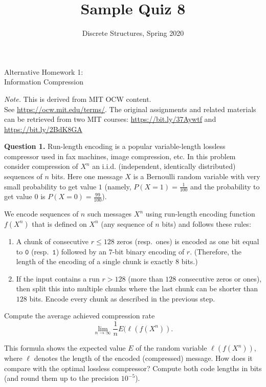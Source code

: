 \documentclass[jou]{apa6}
\title{Sample Quiz 8}
\author{Discrete Structures, Spring 2020}
\affiliation{RBS}
\begin{document}
\twocolumn
\thispagestyle{empty}

\begin{center}
{\Large Alternative Homework 1:}\\
{\Large Information Compression}
\end{center}


\begin{changemargin}{10pt}{10pt}
{\footnotesize
{\em Note.} This is derived from MIT OCW content.\\
See \url{https://ocw.mit.edu/terms/}. 
The original assignments and related materials can be retrieved from two MIT courses:
\url{https://bit.ly/37Aywtf} and \url{https://bit.ly/2BdK8GA}\\
}
\end{changemargin}


{\bf Question 1.} 
Run-length encoding is a popular variable-length lossless compressor used in fax machines, image
compression, etc. 
In this problem consider compression of $X^n$ \textendash{} an i.i.d. (independent, identically distributed) sequences 
of $n$ bits. 
Here one message $X$ is a Bernoulli random variable with very small probability to get value $1$ 
(namely, $P(X=1) = \frac{1}{100}$ and the probability to get value $0$ is $P(X=0) = \frac{99}{100}$). 


We encode sequences of $n$ such messages $X^n$ using run-length encoding function $f(X^n)$ that is defined on $X^n$ 
(any sequence of $n$ bits) and follows these rules:
\begin{enumerate}
\item A chunk of consecutive $r \leq 128$ zeros (resp.\ ones) 
is encoded as one bit equal to $\mathtt{0}$ (resp.\ $\mathtt{1}$) followed by an $7$-bit binary encoding of $r$. 
(Therefore, the length of the encoding of a single chunk is exactly $8$ bits.)
\item If the input contains 
a run $r>128$ (more than $128$ consecutive zeros or ones), then split this into multiple chunks where the last chunk 
can be shorter than $128$ bits. Encode every chunk as described in the previous step.
\end{enumerate}
Compute the average achieved compression rate
$$\lim_{n \rightarrow \infty} \frac{1}{n} E(\ell(f(X^n)).$$

This formula shows the expected value $E$ of the random variable $\ell(f(X^n))$, where 
$\ell$ denotes the length of the encoded (compressed) message. 
How does it compare with the optimal lossless compressor? 
Compute both code lengths in bits (and round them up to the precision $10^{-5}$).
\end{document}
